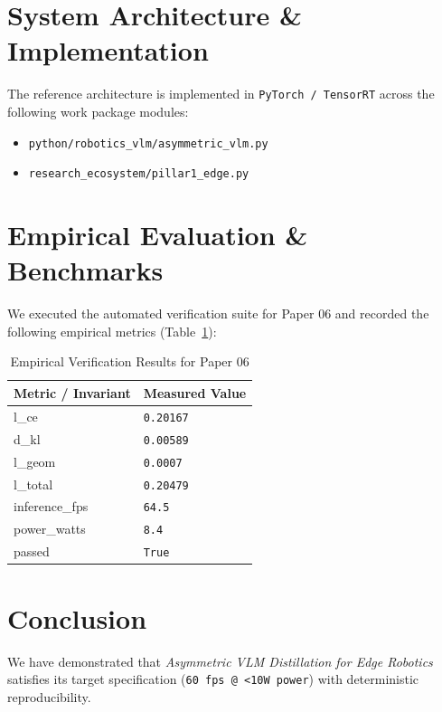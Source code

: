 \documentclass[10pt,twocolumn]{article}
\begin{document}
\section{System Architecture \& Implementation}
The reference architecture is implemented in \texttt{PyTorch / TensorRT} across the following work package modules:
\begin{itemize}
  \item \texttt{python/robotics\_vlm/asymmetric\_vlm.py}
  \item \texttt{research\_ecosystem/pillar1\_edge.py}
\end{itemize}

\section{Empirical Evaluation \& Benchmarks}
We executed the automated verification suite for Paper 06 and recorded the following empirical metrics (Table~\ref{tab:metrics}):

\begin{table}[htbp]
\centering
\caption{Empirical Verification Results for Paper 06}
\label{tab:metrics}
\begin{tabular}{ll}
\toprule
\textbf{Metric / Invariant} & \textbf{Measured Value} \\
\midrule
    l\_ce & \texttt{0.20167} \\
    d\_kl & \texttt{0.00589} \\
    l\_geom & \texttt{0.0007} \\
    l\_total & \texttt{0.20479} \\
    inference\_fps & \texttt{64.5} \\
    power\_watts & \texttt{8.4} \\
    passed & \texttt{True} \\
\bottomrule
\end{tabular}
\end{table}

\section{Conclusion}
We have demonstrated that \textit{Asymmetric VLM Distillation for Edge Robotics} satisfies its target specification (\texttt{60 fps @ <10W power}) with deterministic reproducibility.



\end{document}
